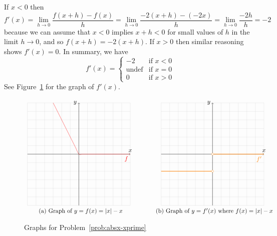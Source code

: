 \documentclass{article}
\begin{document}
\begin{enumerate}
  If $x<0$ then 
  \begin{equation*}
    f'(x) = \lim_{h\to 0} \frac{f(x+h)-f(x)}{h}
    = \lim_{h\to 0} \frac{-2(x+h)-(-2x)}{h} 
    = \lim_{h\to 0} \frac{-2h}{h} = -2
  \end{equation*}
  because we can assume that $x<0$ implies $x+h<0$ for small values of
  $h$ in the limit $h\to 0$, and so $f(x+h) = -2(x+h)$.
  If $x>0$ then similar reasoning shows $f'(x)=0$.  In summary, we
  have
  \begin{equation*}
    f'(x) = \begin{cases}
      -2           & \mbox{if $x<0$} \\
      \mbox{undef} & \mbox{if $x=0$} \\
      0            & \mbox{if $x>0$}
    \end{cases}
  \end{equation*}
  See Figure~\ref{fig:absx-xprime} for the graph of $f'(x)$.
  \begin{figure}[htbp]
    \centering
    $\begin{array}{c@{\hspace{0.5in}}c}
      \begin{tikzpicture}[scale=0.5]
        \draw[very thin,lightgray] (-6,-6) grid (6,6);
        \draw[->] (-6,0)--(6,0) node[above]{$x$};
        \draw[->] (0,-6)--(0,6) node[left]{$y$};
        \draw[red,domain=-3:6] plot[smooth] ({\x}, {abs(\x)-\x})
        node[below left] {$f$};
      \end{tikzpicture}
      &
      \begin{tikzpicture}[scale=0.5]
        \draw[very thin,lightgray] (-6,-6) grid (6,6);
        \draw[->] (-6,0)--(6,0) node[above]{$x$};
        \draw[->] (0,-6)--(0,6) node[left]{$y$};
        \draw[orange,thick] (-6,-2)--(0,-2);
        \draw[orange,thick] (0,0)--(6,0)
        node[below left] {\(f'\)};
        \node[draw=orange,fill=white,inner sep=1.25pt,shape=circle] at
        (0,-2) {};
        \node[draw=orange,fill=white,inner sep=1.25pt,shape=circle] at
        (0,0) {};
      \end{tikzpicture}
    \\
    \mbox{(a) Graph of $y=f(x)=|x|-x$}
    &
    \mbox{(b) Graph of $y=f'(x)$ where $f(x)=|x|-x$}
    \end{array}$
    \caption{Graphs for Problem~\ref{prob:absx-xprime}}
    \label{fig:absx-xprime}
  \end{figure}

\end{enumerate}
\end{document}
